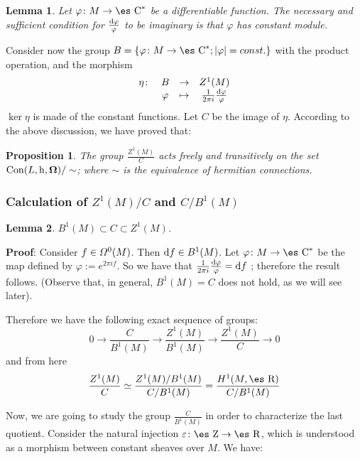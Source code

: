 \documentclass[12pt]{article}
\theoremstyle{plain}
\newtheorem{prop}{Proposition}
\newtheorem{lem}{Lemma}
\def\dst{\(}
\def\qed{\ifvmode\removelastskip\fi
{\unskip\nobreak\hfil\penalty50\hbox{}\nobreak\hfil
\hbox{\vrule height1.2ex width1.2ex}\parfillskip=0pt
\finalhyphendemerits=0 \par\smallskip}}
\def\d{{\rm d}}
\def\h{{\rm h}}
\def\curv{{\bf \Omega}}
\def\Zahl{\mbox{\es Z}}
\def\Real{\mbox{\es R}}
\def\Complex{\mbox{\es C}}
\begin{document}
\begin{lem}
Let $\varphi \colon M \to \Complex^*$ be a differentiable
function. The necessary and sufficient condition for \dst \frac{\d
\varphi}{\varphi}\) to be imaginary is that $\varphi$ has constant
module.
\end{lem}

Consider now the group
$B = \{ \varphi \colon M \to \Complex^* ; |\varphi | = const. \}$
with the product operation, and the morphism
$$
\begin{array}{cccc}
\eta \colon & B & \rightarrow & Z^1(M)
\\
& \varphi & \mapsto & \frac{1}{2\pi i}\frac{\d \varphi}{\varphi}
\end{array}
$$
$\ker \eta$ is made of the constant functions.
Let $C$ be the image of $\eta$.
According to the above discussion,
we have proved that:

\begin{prop}
The group \dst \frac{Z^1(M)}{C}\)
acts freely and transitively on the set
${\rm Con}(L,\h ,\curv )/ \sim$;
where $\sim$ is the equivalence of hermitian connections.
\end{prop}



\subsubsection{Calculation of $Z^1(M)/C$ and $C/B^1(M)$}


\begin{lem}
$B^1(M) \subset C \subset Z^1(M)$.
\end{lem}
{\bf Proof}: 
Consider $f \in {\mit\Omega}^0(M)$. Then $\d f \in B^1(M)$.
Let $\varphi \colon M \to \Complex^*$ be the map
defined by $\varphi := e^{2\pi if}$.
So we have that
\dst\frac{1}{2\pi i} \frac{\d \varphi}{\varphi} = \d f\) ;
therefore the result follows.
(Observe that, in general,
$B^1(M) =C$ does not hold, as we will see later).
\qed

Therefore we have the following exact sequence of groups:
$$
0 \to \frac{C}{B^1(M)} \to \frac{Z^1(M)}{B^1(M)}
\to \frac{Z^1(M)}{C} \to 0
$$
and from here
$$
\frac{Z^1(M)}{C} \simeq \frac{Z^1(M)/B^1(M)}{C/B^1(M)}
= \frac{H^1(M,\Real )}{C /B^1(M)}
$$

Now, we are going to study the group $\frac{C}{B^1(M)}$
in order to characterize the last quotient.
Consider the natural injection $\varepsilon \colon \Zahl \to \Real$,
which is
understood as a morphism between constant sheaves over $M$. We have:
\end{document}
